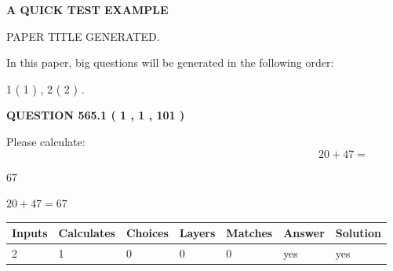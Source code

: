 \documentclass[12pt]{article}
\begin{document}
   
 \vspace{0.2in}
{\LARGE {\textbf{ A QUICK TEST EXAMPLE}}}
   
   
 PAPER TITLE GENERATED.
   
   
   
\vspace{0.2in}
   
In this paper, big questions will be generated in the following order: 
   
   
   1 ( 1 )
 ,
   2 ( 2 )
 .
  
\vspace{0.2in}
  
{\textbf{\Large{QUESTION
565.1 
 ( 1 , 1 , 101 )
}}}
  
  
 
Please calculate:
\begin{equation}
20 +  %
47 = \nonumber
\end{equation}
 
 
 
\noindent{}
 
 

67
 
 
\noindent{}
 
 

 
 
 
\noindent{}
 
 

$ %
20 +  %
47=   %
67$
 
 
\noindent{}
 
 

 
   
   
   
   
\noindent\begin{tabular}{|l|l|l|l|l|l|l|}
 \hline
Inputs & Calculates & Choices & Layers & Matches & Answer & Solution \\ \hline
 2  & 
 1  & 
 0
  & 
 0  & 
 0  & 
  yes & 
  yes 
  \\ \hline
 \end{tabular}
   
   
   
   
\noindent{}
   
\end{document}
